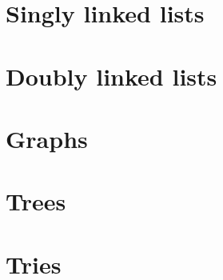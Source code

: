 \section{Singly linked lists}


\section{Doubly linked lists}


\section{Graphs}

\section{Trees}

\section{Tries}